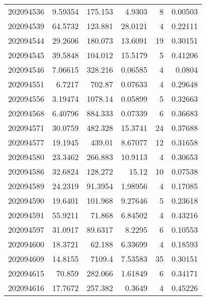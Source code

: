 \begin{tabular}{rrrrrr}
 202094536 &          9.59354 &      175.153  &            4.9303  &           8 & 0.00503 \\
 202094539 &         64.5732  &      123.881  &           28.0121  &           4 & 0.22111 \\
 202094544 &         29.2606  &      180.073  &           13.6091  &          19 & 0.30151 \\
 202094545 &         39.5848  &      104.012  &           15.5179  &           5 & 0.41206 \\
 202094546 &          7.06615 &      328.216  &            0.06585 &           4 & 0.0804  \\
 202094551 &          6.7217  &      702.87   &            0.07633 &           4 & 0.29648 \\
 202094556 &          3.19474 &     1078.14   &            0.05899 &           5 & 0.32663 \\
 202094568 &          6.40796 &      884.333  &            0.07339 &           6 & 0.36683 \\
 202094571 &         30.0759  &      482.328  &           15.3741  &          24 & 0.37688 \\
 202094577 &         19.1945  &      439.01   &            8.67077 &          12 & 0.31658 \\
 202094580 &         23.3462  &      266.883  &           10.9113  &           4 & 0.30653 \\
 202094586 &         32.6824  &      128.272  &           15.12    &          10 & 0.07538 \\
 202094589 &         24.2319  &       91.3954 &            1.98956 &           4 & 0.17085 \\
 202094590 &         19.6401  &      101.968  &            9.27646 &           5 & 0.23618 \\
 202094591 &         55.9211  &       71.868  &            6.84502 &           4 & 0.43216 \\
 202094597 &         31.0917  &       89.6317 &            8.2295  &           6 & 0.10553 \\
 202094600 &         18.3721  &       62.188  &            6.33699 &           4 & 0.18593 \\
 202094609 &         14.8155  &     7109.4    &            7.53583 &          35 & 0.30151 \\
 202094615 &         70.859   &      282.066  &            1.61849 &           6 & 0.34171 \\
 202094616 &         17.7672  &      257.382  &            0.3649  &           4 & 0.45226 \\

\end{tabular}
